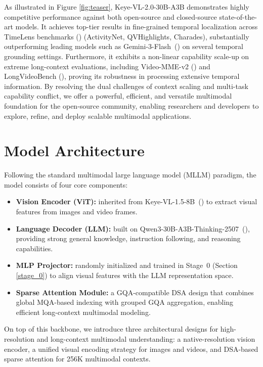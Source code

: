 \documentclass{llmxive}
\begin{document}
As illustrated in Figure \ref{fig:teaser}, Keye-VL-2.0-30B-A3B demonstrates highly competitive performance against both open-source and closed-source state-of-the-art models. It achieves top-tier results in fine-grained temporal localization across TimeLens benchmarks (\cite{zhang2025timelens}) (ActivityNet, QVHighlights, Charades), substantially outperforming leading models such as Gemini-3-Flash~(\cite{deepmind2025gemini3flash}) on several temporal grounding settings. Furthermore, it exhibits a non-linear capability scale-up on extreme long-context evaluations, including Video-MME-v2 (\cite{fu2026videomme2}) and LongVideoBench (\cite{wu2024longvideobench}), proving its robustness in processing extensive temporal information. By resolving the dual challenges of context scaling and multi-task capability conflict, we offer a powerful, efficient, and versatile multimodal foundation for the open-source community, enabling researchers and developers to explore, refine, and deploy scalable multimodal applications.



\section{Model Architecture}

 Following the standard multimodal large language model (MLLM) paradigm, the model consists of four core components:

\begin{itemize}
    \item \textbf{Vision Encoder (ViT):} inherited from Keye-VL-1.5-8B~(\cite{kwaikeye2025vl}) to extract visual features from images and video frames.
    \item \textbf{Language Decoder (LLM):} built on Qwen3-30B-A3B-Thinking-2507~(\cite{qwen3}), providing strong general knowledge, instruction following, and reasoning capabilities.
    \item \textbf{MLP Projector:} randomly initialized and trained in Stage~0 (Section \ref{stage_0}) to align visual features with the LLM representation space.
    \item \textbf{Sparse Attention Module:} a GQA-compatible DSA design that combines global MQA-based indexing with grouped GQA aggregation, enabling efficient long-context multimodal modeling.
\end{itemize}

On top of this backbone, we introduce three architectural designs for high-resolution and long-context multimodal understanding: a native-resolution vision encoder, a unified visual encoding strategy for images and videos, and DSA-based sparse attention for 256K multimodal contexts.
\end{document}
